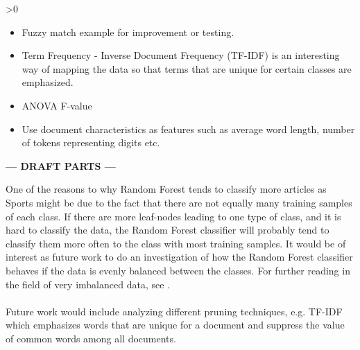 \ifnum\printdraft>0
	\begin{itemize}
		\item Fuzzy match example for improvement or testing.
		\item Term Frequency - Inverse Document Frequency (TF-IDF) is an interesting way of mapping the data so that terms that are unique for certain classes are emphasized.
		\item ANOVA F-value
		\item Use document characteristics as features such as average word length, number of tokens representing digits etc.
	\end{itemize}
\else
\begin{center}
	\textbf{--- DRAFT PARTS ---}
\end{center}
\fi

One of the reasons to why Random Forest tends to classify more articles as Sports might be due to the fact that there are not equally many training samples of each class. If there are more leaf-nodes leading to one type of class, and it is hard to classify the data, the Random Forest classifier will probably tend to classify them more often to the class with most training samples. It would be of interest as future work to do an investigation of how the Random Forest classifier behaves if the data is evenly balanced between the classes. For further reading in the field of very imbalanced data, see \cite{Chen}.
\\\\
Future work would include analyzing different pruning techniques, e.g. TF-IDF which emphasizes words that are unique for a document and suppress the value of common words among all documents. 
